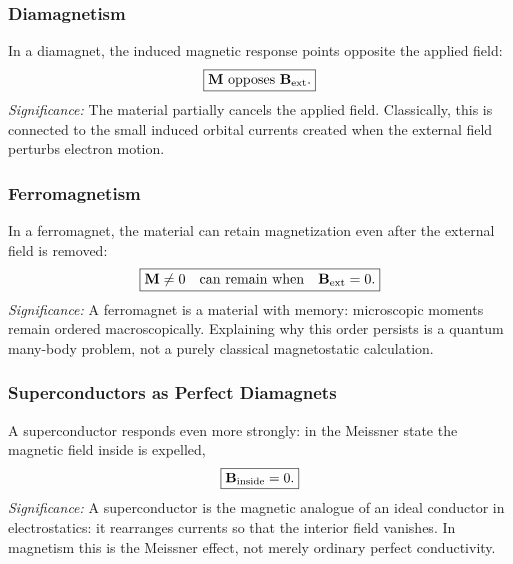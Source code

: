\subsubsection*{Diamagnetism}
In a diamagnet, the induced magnetic response points opposite the applied field:
\begin{equation}\label{eq:lec16-diamag}
  \boxed{\mathbf{M}\ \text{opposes}\ \mathbf{B}_{\rm ext}.}
\end{equation}
\textit{Significance:} The material partially cancels the applied field.  Classically,
this is connected to the small induced orbital currents created when the external field
perturbs electron motion.

\subsubsection*{Ferromagnetism}
In a ferromagnet, the material can retain magnetization even after the external field
is removed:
\begin{equation}\label{eq:lec16-ferromag}
  \boxed{\mathbf{M}\neq 0\quad\text{can remain when}\quad \mathbf{B}_{\rm ext}=0.}
\end{equation}
\textit{Significance:} A ferromagnet is a material with memory: microscopic moments
remain ordered macroscopically.  Explaining why this order persists is a quantum
many-body problem, not a purely classical magnetostatic calculation.

\subsubsection*{Superconductors as Perfect Diamagnets}
A superconductor responds even more strongly: in the Meissner state the magnetic field
inside is expelled,
\begin{equation}\label{eq:lec16-meissner}
  \boxed{\mathbf{B}_{\rm inside}=0.}
\end{equation}
\textit{Significance:} A superconductor is the magnetic analogue of an ideal conductor
in electrostatics: it rearranges currents so that the interior field vanishes.  In
magnetism this is the Meissner effect, not merely ordinary perfect conductivity.

